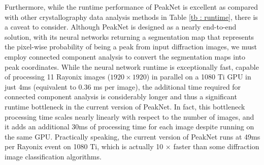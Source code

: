 \documentclass[conference]{IEEEtran}
\newcommand{\peaknet}{PeakNet}
\begin{document}
Furthermore, while the runtime performance of \peaknet{} is excellent as
compared with other crystallography data analysis methods in Table \ref{tb :
runtime}, there is a caveat to consider.  Although \peaknet{} is designed as a
nearly end-to-end solution, with its neural networks returning a segmentation
map that represents the pixel-wise probability of being a peak from input
diffraction images, we must employ connected component analysis to convert the
segmentation maps into peak coordinates.  While the neural network runtime is
exceptionally fast, capable of processing 11 Rayonix images ($1920 \times 1920$)
in parallel on a 1080 Ti GPU in just 4ms (equivalent to 0.36 ms per image), the
additional time required for connected component analysis is considerably longer
and thus a significant runtime bottleneck in the current version of \peaknet{}.
In fact, this bottleneck processing time scales nearly linearly with respect to
the number of images, and it adds an additional 30ms of processing time for each
image despite running on the same GPU.  Practically speaking, the current
version of \peaknet{} runs at 49ms per Rayonix event on 1080 Ti, which is
actually 10 $\times$ faster than some diffraction image classification
algorithms.
\end{document}
